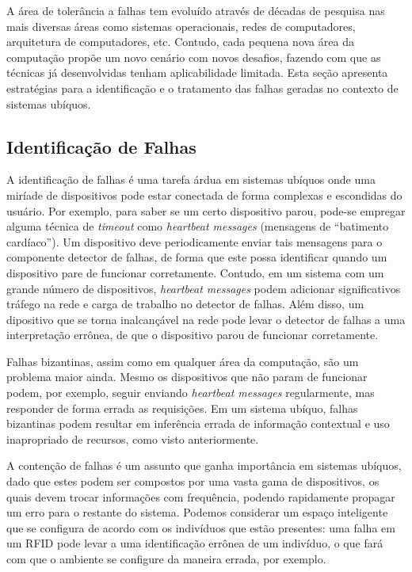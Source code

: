 A área de tolerância a falhas tem evoluído através de décadas de pesquisa nas mais diversas áreas como sistemas operacionais, redes de computadores, arquitetura de computadores, etc. Contudo, cada pequena nova área da computação propõe um novo cenário com novos desafios, fazendo com que as técnicas já desenvolvidas tenham aplicabilidade limitada. Esta seção apresenta estratégias para a identificação e o tratamento das falhas geradas no contexto de sistemas ubíquos.

\subsection{Identificação de Falhas} %
\label{sub:identificacao}

A identificação de falhas é uma tarefa árdua em sistemas ubíquos onde uma miríade de dispositivos pode estar conectada de forma complexas e escondidas do usuário. Por exemplo, para saber se um certo dispositivo parou, pode-se empregar alguma técnica de \emph{timeout} como \emph{heartbeat messages} (mensagens de ``batimento cardíaco''). Um dispositivo deve periodicamente enviar tais mensagens para o componente detector de falhas, de forma que este possa identificar quando um dispositivo pare de funcionar corretamente. Contudo, em um sistema com um grande número de dispositivos, \emph{heartbeat messages} podem adicionar significativos tráfego na rede e carga de trabalho no detector de falhas. Além disso, um dipositivo que se torna inalcançável na rede pode levar o detector de falhas a uma interpretação errônea, de que o dispositivo parou de funcionar corretamente.

Falhas bizantinas, assim como em qualquer área da computação, são um problema maior ainda. Mesmo os dispositivos que não param de funcionar podem, por exemplo, seguir enviando \emph{heartbeat messages} regularmente, mas responder de forma errada as requisições. Em um sistema ubíquo, falhas bizantinas podem resultar em inferência errada de informação contextual e uso inapropriado de recursos, como visto anteriormente.

A contenção de falhas é um assunto que ganha importância em sistemas ubíquos, dado que estes podem ser compostos por uma vasta gama de dispositivos, os quais devem trocar informações com frequência, podendo rapidamente propagar um erro para o restante do sistema. Podemos considerar um espaço inteligente que se configura de acordo com os indivíduos que estão presentes: uma falha em um RFID pode levar a uma identificação errônea de um indivíduo, o que fará com que o ambiente se configure da maneira errada, por exemplo.

